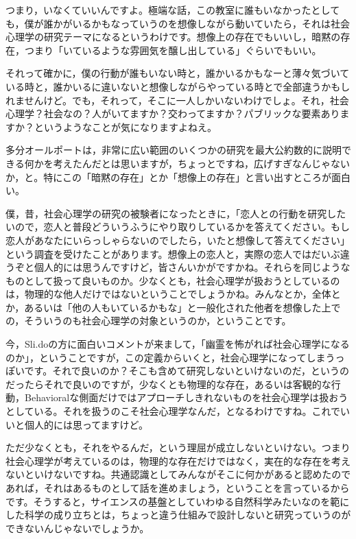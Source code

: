 \documentclass{ltjsbook}
\begin{document}
つまり，いなくていいんですよ。極端な話，この教室に誰もいなかったとしても，僕が誰かがいるかもなっていうのを想像しながら動いていたら，それは社会心理学の研究テーマになるというわけです。想像上の存在でもいいし，暗黙の存在，つまり「いているような雰囲気を醸し出している」ぐらいでもいい。

それって確かに，僕の行動が誰もいない時と，誰かいるかもなーと薄々気づいている時と，誰かいるに違いないと想像しながらやっている時とで全部違うかもしれませんけど。でも，それって，そこに一人しかいないわけでしょ。それ，社会心理学？社会なの？人がいてますか？交わってますか？パブリックな要素ありますか？というようなことが気になりますよねえ。

多分オールポートは，非常に広い範囲のいくつかの研究を最大公約数的に説明できる何かを考えたんだとは思いますが，ちょっとですね，広げすぎなんじゃないか，と。特にこの「暗黙の存在」とか「想像上の存在」と言い出すところが面白い。

僕，昔，社会心理学の研究の被験者になったときに，「恋人との行動を研究したいので，恋人と普段どういうふうにやり取りしているかを答えてください。もし恋人があなたにいらっしゃらないのでしたら，いたと想像して答えてください」という調査を受けたことがあります。想像上の恋人と，実際の恋人ではだいぶ違うぞと個人的には思うんですけど，皆さんいかがですかね。それらを同じようなものとして扱って良いものか。少なくとも，社会心理学が扱おうとしているのは，物理的な他人だけではないということでしょうかね。みんなとか，全体とか，あるいは「他の人もいているかもな」と一般化された他者を想像した上での，そういうのも社会心理学の対象というのか，ということです。

今，Sli.doの方に面白いコメントが来まして，「幽霊を怖がれば社会心理学になるのか」，ということですが，この定義からいくと，社会心理学になってしまうっぽいです。それで良いのか？そこも含めて研究しないといけないのだ，というのだったらそれで良いのですが，少なくとも物理的な存在，あるいは客観的な行動，Behavioralな側面だけではアプローチしきれないものを社会心理学は扱おうとしている。それを扱うのこそ社会心理学なんだ，となるわけですね。これでいいと個人的には思ってますけど。

ただ少なくとも，それをやるんだ，という理屈が成立しないといけない。つまり社会心理学が考えているのは，物理的な存在だけではなく，実在的な存在を考えないといけないですね。共通認識としてみんながそこに何かがあると認めたのであれば，それはあるものとして話を進めましょう，ということを言っているからです。そうすると，サイエンスの基盤としていわゆる自然科学みたいなのを範にした科学の成り立ちとは，ちょっと違う仕組みで設計しないと研究っていうのができないんじゃないでしょうか。
\end{document}
